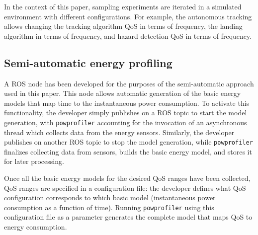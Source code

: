 \documentclass[conference, onecolumn, draftclsnofoot]{IEEEtran}
\newcommand{\stt}[1]{{\small\tt #1}} %
\newcommand{\powprof}{\stt{powprofiler}}
\begin{document}

In the context of this paper, sampling experiments are iterated in a
simulated environment with different configurations.  For example, the
autonomous tracking allows changing the tracking algorithm QoS in
terms of frequency, the landing algorithm in terms of frequency, and
hazard detection QoS in terms of frequency.
%


\subsection{Semi-automatic energy profiling}
\label{sec:semi-automatic}


%
A ROS node has been developed for the purposes of the semi-automatic %
approach used in this paper. This node allows automatic
generation of the basic energy models that map time to the
instantaneous power consumption. To activate this functionality, the developer simply publishes on a ROS
topic to start the model generation, with \powprof{} accounting for
the invocation of an asynchronous thread which collects data from the
energy sensors. Similarly, the developer publishes on another ROS topic to
stop the model generation, while \powprof{} finalizes collecting data from
sensors, builds the basic energy model, and stores it for later processing.


Once all the basic energy models for the desired QoS ranges have been
collected, QoS ranges %
are specified in a configuration file: the developer defines
what QoS configuration corresponds to which basic model
(instantaneous power consumption as a function of time). Running
\powprof{} using this configuration file as a parameter generates the
complete model that maps QoS to energy consumption.
%
\end{document}
